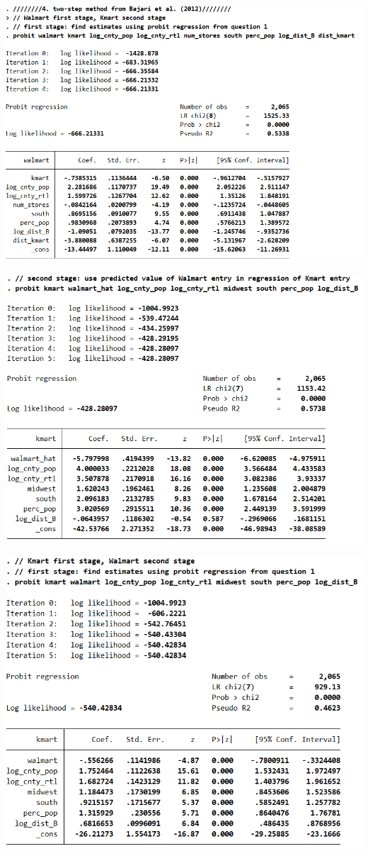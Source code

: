 \documentclass[11pt]{article} %
\begin{document}
\begin{center}
\includegraphics{fig7}

\includegraphics{fig8}

\includegraphics{fig9}


\end{center}
\end{document}
